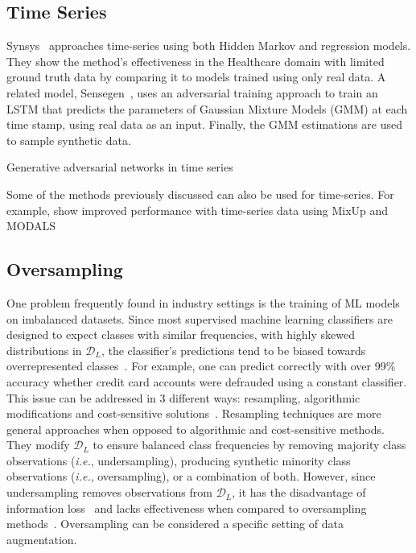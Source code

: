 \documentclass[parskip=full]{scrartcl}
\begin{document}


\subsection{Time Series}


Synsys~\cite{dahmen2019synsys} approaches time-series using both Hidden Markov
and regression models. They show the method's effectiveness in the Healthcare
domain with limited ground truth data by comparing it to models trained using
only real data. A related model, Sensegen~\cite{alzantot2017sensegen}, uses an
adversarial training approach to train an LSTM that predicts the parameters
of Gaussian Mixture Models (GMM) at each time stamp, using real data as
an input. Finally, the GMM estimations are used to sample synthetic data. 


Generative adversarial networks in time series 


Some of the methods previously discussed can also be used for time-series. For
example, \citet{cheung2020modals} show improved performance with time-series
data using MixUp and MODALS

\subsection{Oversampling}\label{sec:oversampling}

One problem frequently found in industry settings is the training of ML models
on imbalanced datasets. Since most supervised machine learning classifiers are
designed to expect classes with similar frequencies, with highly skewed
distributions in $\mathcal{D}_L$, the classifier’s predictions tend to be
biased towards overrepresented classes~\cite{fonseca2021improving}. For
example, one can predict correctly with over 99\% accuracy whether credit card
accounts were defrauded using a constant classifier. This issue can be
addressed in 3 different ways: resampling, algorithmic modifications and
cost-sensitive solutions~\cite{douzas2019imbalanced}. Resampling techniques
are more general approaches when opposed to algorithmic and cost-sensitive
methods. They modify $\mathcal{D}_L$ to ensure balanced class frequencies by
removing majority class observations (\textit{i.e.}, undersampling), producing
synthetic minority class observations (\textit{i.e.}, oversampling), or a
combination of both. However, since undersampling removes observations from
$\mathcal{D}_L$, it has the disadvantage of information
loss~\cite{feng2019imbalanced} and lacks effectiveness when compared to
oversampling methods~\cite{mohammed2020machine, hernandez2013empirical}.
Oversampling can be considered a specific setting of data augmentation.
\end{document}
